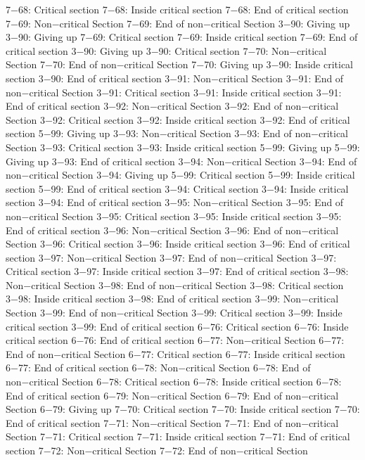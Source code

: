 7−68: Critical section
7−68: Inside critical section
7−68: End of critical section
7−69: Non−critical Section
7−69: End of non−critical Section
3−90: Giving up
3−90: Giving up
7−69: Critical section
7−69: Inside critical section
7−69: End of critical section
3−90: Giving up
3−90: Critical section
7−70: Non−critical Section
7−70: End of non−critical Section
7−70: Giving up
3−90: Inside critical section
3−90: End of critical section
3−91: Non−critical Section
3−91: End of non−critical Section
3−91: Critical section
3−91: Inside critical section
3−91: End of critical section
3−92: Non−critical Section
3−92: End of non−critical Section
3−92: Critical section
3−92: Inside critical section
3−92: End of critical section
5−99: Giving up
3−93: Non−critical Section
3−93: End of non−critical Section
3−93: Critical section
3−93: Inside critical section
5−99: Giving up
5−99: Giving up
3−93: End of critical section
3−94: Non−critical Section
3−94: End of non−critical Section
3−94: Giving up
5−99: Critical section
5−99: Inside critical section
5−99: End of critical section
3−94: Critical section
3−94: Inside critical section
3−94: End of critical section
3−95: Non−critical Section
3−95: End of non−critical Section
3−95: Critical section
3−95: Inside critical section
3−95: End of critical section
3−96: Non−critical Section
3−96: End of non−critical Section
3−96: Critical section
3−96: Inside critical section
3−96: End of critical section
3−97: Non−critical Section
3−97: End of non−critical Section
3−97: Critical section
3−97: Inside critical section
3−97: End of critical section
3−98: Non−critical Section
3−98: End of non−critical Section
3−98: Critical section
3−98: Inside critical section
3−98: End of critical section
3−99: Non−critical Section
3−99: End of non−critical Section
3−99: Critical section
3−99: Inside critical section
3−99: End of critical section
6−76: Critical section
6−76: Inside critical section
6−76: End of critical section
6−77: Non−critical Section
6−77: End of non−critical Section
6−77: Critical section
6−77: Inside critical section
6−77: End of critical section
6−78: Non−critical Section
6−78: End of non−critical Section
6−78: Critical section
6−78: Inside critical section
6−78: End of critical section
6−79: Non−critical Section
6−79: End of non−critical Section
6−79: Giving up
7−70: Critical section
7−70: Inside critical section
7−70: End of critical section
7−71: Non−critical Section
7−71: End of non−critical Section
7−71: Critical section
7−71: Inside critical section
7−71: End of critical section
7−72: Non−critical Section
7−72: End of non−critical Section
